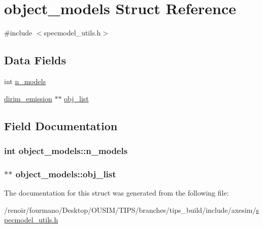 \hypertarget{structobject__models}{
\section{object\_\-models Struct Reference}
\label{structobject__models}
}


{\ttfamily \#include $<$specmodel\_\-utils.h$>$}\subsection*{Data Fields}
\begin{DoxyCompactItemize}
\item 
int \hyperlink{structobject__models_a5810731176663b015f18d20d29b194ee}{n\_\-models}
\item 
\hyperlink{structdirim__emission}{dirim\_\-emission} $\ast$$\ast$ \hyperlink{structobject__models_afdd965836e9c88e46e75d644a2f31af0}{obj\_\-list}
\end{DoxyCompactItemize}


\subsection{Field Documentation}
\hypertarget{structobject__models_a5810731176663b015f18d20d29b194ee}{
\subsubsection[{n\_\-models}]{\setlength{\rightskip}{0pt plus 5cm}int {\bf object\_\-models::n\_\-models}}}
\label{structobject__models_a5810731176663b015f18d20d29b194ee}
\hypertarget{structobject__models_afdd965836e9c88e46e75d644a2f31af0}{
\subsubsection[{obj\_\-list}]{$\ast$$\ast$ {\bf object\_\-models::obj\_\-list}}}
\label{structobject__models_afdd965836e9c88e46e75d644a2f31af0}


The documentation for this struct was generated from the following file:\begin{DoxyCompactItemize}
\item 
/renoir/fourmano/Desktop/OUSIM/TIPS/branches/tips\_\-build/include/axesim/\hyperlink{specmodel__utils_8h}{specmodel\_\-utils.h}\end{DoxyCompactItemize}
